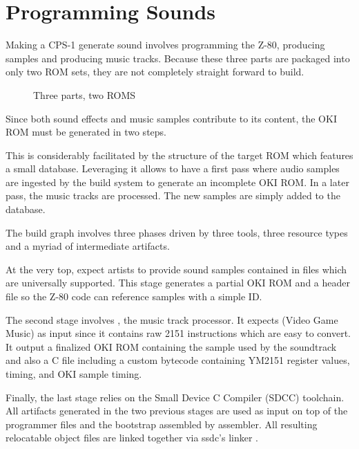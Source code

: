 \chapter{Programming Sounds}

Making a CPS-1 generate sound involves programming the Z-80, producing samples and producing music tracks. Because these three parts are packaged into only two ROM sets, they are not completely straight forward to build. 

 \begin{figure}[H]
\caption*{Three parts, two ROMS}
\end{figure}


Since both sound effects and music samples contribute to its content, the OKI ROM must be generated in two steps.

This is considerably facilitated by the structure of the target ROM which features a small database. Leveraging it allows to have a first pass where audio samples are ingested by the build system to generate an incomplete OKI ROM. In a later pass, the music tracks are processed. The new samples are simply added to the database.


The build graph involves three phases driven by three tools, three resource types and a myriad of intermediate artifacts. 

At the very top,  expect artists to provide sound samples contained in  files which are universally supported. This stage generates a partial OKI ROM and a  header file so the Z-80 code can reference samples with a simple ID.

The second stage involves , the music track processor. It expects  (Video Game Music) as input since it contains raw 2151 instructions which are easy to convert. It output a finalized OKI ROM containing the sample used by the soundtrack and also a  C file including a custom bytecode containing YM2151 register values, timing, and OKI sample timing.

Finally, the last stage relies on the Small Device C Compiler (SDCC) toolchain. All artifacts generated in the two previous stages are used as input on top of the programmer  files and the bootstrap  assembled by  assembler. All resulting relocatable object files  are linked together via ssdc's linker . 



